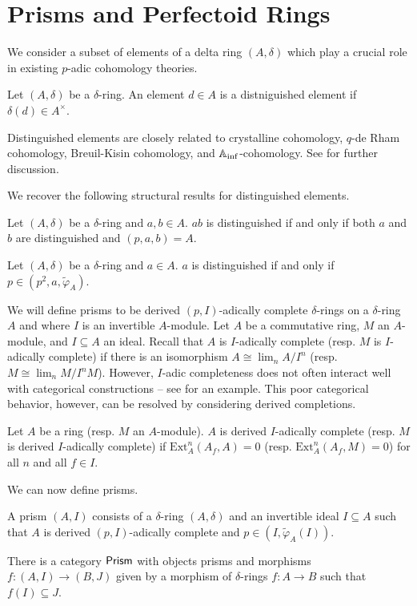 \section{Prisms and Perfectoid Rings}\label{sec: prisms}
We consider a subset of elements of a delta ring $(A,\delta)$ which play a crucial role in existing $p$-adic cohomology theories. 
\begin{definition}\label{def: distinguished element}
    Let $(A,\delta)$ be a $\delta$-ring. An element $d\in A$ is a distniguished element if $\delta(d)\in A^{\times}$. 
\end{definition}
Distinguished elements are closely related to crystalline cohomology, $q$-de Rham cohomology, Breuil-Kisin cohomology, and $\mathbb{A}_{\inf}$-cohomology. See \cite[Ex. 5.13-16]{Kedlaya} for further discussion. 

We recover the following structural results for distinguished elements. 
\begin{lemma}\label{lem: product distinguished iff factors distinguished}
    Let $(A,\delta)$ be a $\delta$-ring and $a,b\in A$. $ab$ is distinguished if and only if both $a$ and $b$ are distinguished and $(p,a,b)=A$. 
\end{lemma}
\begin{lemma}\label{lem: distinguished iff p is in an ideal}
    Let $(A,\delta)$ be a $\delta$-ring and $a\in A$. $a$ is distinguished if and only if $p\in(p^{2},a,\widetilde{\varphi}_{A})$. 
\end{lemma}

We will define prisms to be derived $(p,I)$-adically complete $\delta$-rings on a $\delta$-ring $A$ and where $I$ is an invertible $A$-module. Let $A$ be a commutative ring, $M$ an $A$-module, and $I\subseteq A$ an ideal. Recall that $A$ is $I$-adically complete (resp. $M$ is $I$-adically complete) if there is an isomorphism $A\cong \lim_{n}A/I^{n}$ (resp. $M\cong\lim_{n}M/I^{n}M$). However, $I$-adic completeness does not often interact well with categorical constructions -- see \cite[\href{https://stacks.math.columbia.edu/tag/05JD}{Tag 05JD}]{stacks-project} for an example. This poor categorical behavior, however, can be resolved by considering derived completions. 
\begin{definition}\label{def: derived complete}
    Let $A$ be a ring (resp. $M$ an $A$-module). $A$ is derived $I$-adically complete (resp. $M$ is derived $I$-adically complete) if $\mathrm{Ext}^{n}_{A}(A_{f},A)=0$ (resp. $\mathrm{Ext}^{n}_{A}(A_{f},M)=0$) for all $n$ and all $f\in I$. 
\end{definition}
We can now define prisms. 
\begin{definition}[Prism]\label{def: prism}
    A prism $(A,I)$ consists of a $\delta$-ring $(A,\delta)$ and an invertible ideal $I\subseteq A$ such that $A$ is derived $(p,I)$-adically complete and $p\in(I,\widetilde{\varphi}_{A}(I))$. 
\end{definition}
There is a category $\mathsf{Prism}$ with objects prisms and morphisms $f:(A,I)\to(B,J)$ given by a morphism of $\delta$-rings $f:A\to B$ such that $f(I)\subseteq J$. 

